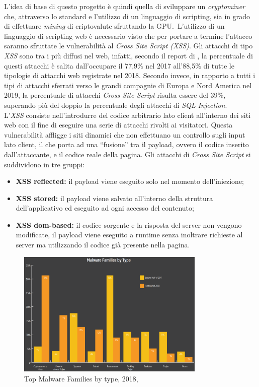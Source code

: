\documentclass[
11pt, %
oneside, %
italian, %
onehalfspacing,%
headsepline, %
]{MastersDoctoralThesis} %
\newcommand\citen[1]{\citeauthor{#1} \citep{#1}}
\newcommand\citetitlen[1]{\citetitle{#1} \citep{#1}}
\begin{document}
L'idea di base di questo progetto è quindi quella di sviluppare un \emph{cryptominer} che, attraverso lo standard \citetitlen{OpenGL} e l'utilizzo di un linguaggio di scripting, sia in grado di effettuare \emph{mining} di criptovalute sfruttando la GPU.\ L'utilizzo di un linguaggio di scripting web è necessario visto che per portare a termine l'attacco saranno sfruttate le vulnerabilità al \emph{Cross Site Script (XSS)}. Gli attacchi di tipo \emph{XSS} sono tra i più diffusi nel web, infatti, secondo il report di \citen{PositiveTechnologiesReport}, la percentuale di questi attacchi è salita dall'occupare il 77,9\% nel 2017 all'88,5\% di tutte le tipologie di attacchi web registrate nel 2018. Secondo \citen{PreciseSecurityReport} invece, in rapporto a tutti i tipi di attacchi sferrati verso le grandi compagnie di Europa e Nord America nel 2019, la percentuale di attacchi \emph{Cross Site Script} risulta essere del 39\%, superando più del doppio la percentuale degli attacchi di \emph{SQL Injection}.\\
L'\emph{XSS} consiste nell’introdurre del codice arbitrario lato client all'interno dei siti web con il fine di eseguire una serie di attacchi rivolti ai visitatori. Questa vulnerabilità affligge i siti dinamici che non effettuano un controllo sugli input lato client, il che porta ad una ``fusione'' tra il payload, ovvero il codice inserito dall'attaccante, e il codice reale della pagina. Gli attacchi di \emph{Cross Site Script} si suddividono in tre gruppi:
\begin{itemize}
  \item\textbf{XSS reflected:} il payload viene eseguito solo nel momento dell’iniezione;
  \item\textbf{XSS stored:} il payload viene salvato all'interno della struttura dell'applicativo ed eseguito ad ogni accesso del contenuto;
  \item\textbf{XSS dom-based:} il codice sorgente e la risposta del server non vengono modificate, il payload viene eseguito a runtime senza inoltrare richieste al server ma utilizzando il codice già presente nella pagina.
\end{itemize}

\begin{figure}[hbt!]
\caption{Top Malware Families by type, 2018, \citetitlen{skyboxtrends}}\label{fig:topmalwarefamilies}
\centering
\includegraphics[width=0.8\textwidth]{TopMalwareFamilies.png}
\end{figure}
\end{document}
